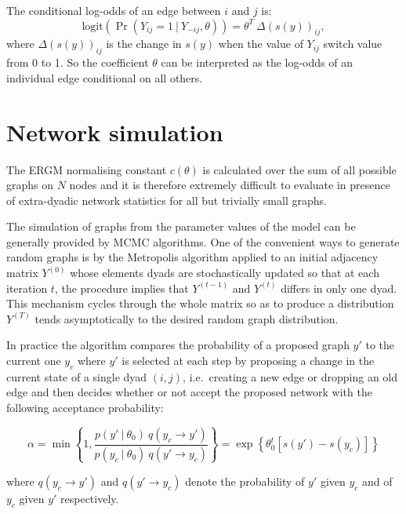 \documentclass[]{book}
\begin{document}
The conditional log-odds of an edge between \(i\) and \(j\) is: \[
\mathrm{logit} \left( \Pr(Y_{ij} = 1\ |\ Y_{-ij}, \theta ) \right) = \theta^T\ \Delta (s(y))_{ij}, 
\] where \(\Delta (s(y))_{ij}\) is the change in \(s(y)\) when the value
of \(Y_{ij}\) switch value from 0 to 1. So the coefficient \(\theta\)
can be interpreted as the log-odds of an individual edge conditional on
all others.

\section{Network simulation}\label{network-simulation-1}

The ERGM normalising constant \(c(\theta)\) is calculated over the sum
of all possible graphs on \(N\) nodes and it is therefore extremely
difficult to evaluate in presence of extra-dyadic network statistics for
all but trivially small graphs.

The simulation of graphs from the parameter values of the model can be
generally provided by MCMC algorithms. One of the convenient ways to
generate random graphs is by the Metropolis algorithm applied to an
initial adjacency matrix \(Y^{(0)}\) whose elements dyads are
stochastically updated so that at each iteration \(t\), the procedure
implies that \(Y^{(t-1)}\) and \(Y^{(t)}\) differs in only one dyad.
This mechanism cycles through the whole matrix so as to produce a
distribution \(Y^{(T)}\) tends asymptotically to the desired random
graph distribution.

In practice the algorithm compares the probability of a proposed graph
\(y'\) to the current one \(y_c\) where \(y'\) is selected at each step
by proposing a change in the current state of a single dyad \((i,j)\),
i.e.~creating a new edge or dropping an old edge and then decides
whether or not accept the proposed network with the following acceptance
probability:

\begin{equation*}
\alpha 
   =\min
    \left\lbrace 
    1,\frac{p(y'\ |\ \theta_0)\ q(y_c \rightarrow y')}
           {p(y_c\ |\ \theta_0)\ q(y' \rightarrow y_c)}
    \right\rbrace 
   =\exp
    \left\lbrace 
    \theta_0^t 
    \left[
    s(y') - s(y_c)
    \right]
    \right\rbrace
\end{equation*}

where \(q(y_c \rightarrow y')\) and \(q(y' \rightarrow y_c)\) denote the
probability of \(y'\) given \(y_c\) and of \(y_c\) given \(y'\)
respectively.
\end{document}
